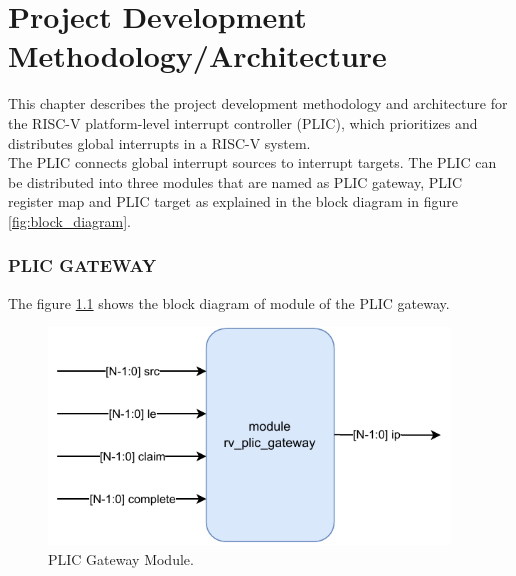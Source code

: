 
\chapter{Project Development Methodology/Architecture}
\label{Chapter5}



This chapter describes the project development methodology and architecture for the RISC-V platform-level interrupt controller (PLIC), which prioritizes and distributes global interrupts in a RISC-V system.\\ 

The PLIC connects global interrupt sources to interrupt targets. The PLIC can be distributed into three modules that are named as PLIC gateway, PLIC register map and PLIC target as explained in the block diagram in figure \ref{fig:block_diagram}. \\

\subsection{PLIC GATEWAY}
The figure \ref{fig:plic_gateway} shows the block diagram of module of the PLIC gateway.\\

\begin{figure}[h]
  \centering
  \includegraphics[width=0.95\textwidth]{./fatima_figures/un.drawio.pdf}
  \caption{PLIC Gateway Module.}
  \label{fig:plic_gateway}
\end{figure}

